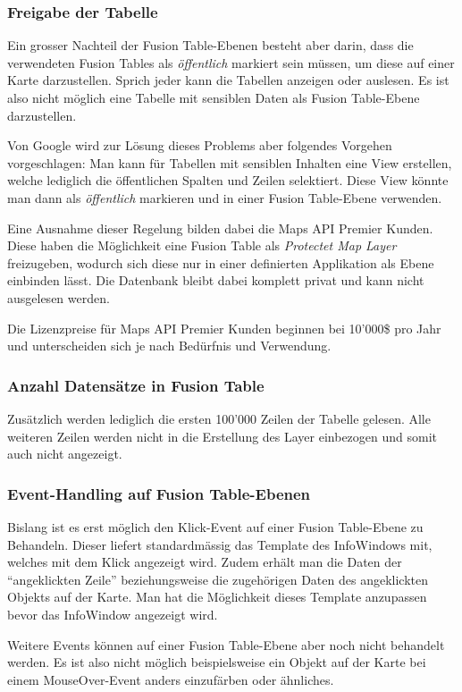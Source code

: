 \subsubsection{Freigabe der Tabelle}
Ein grosser Nachteil der Fusion Table-Ebenen besteht aber darin, dass die verwendeten Fusion Tables als  \emph{öffentlich} markiert sein müssen, um diese auf einer Karte darzustellen. Sprich jeder kann die Tabellen anzeigen oder auslesen. Es ist also nicht möglich eine Tabelle mit sensiblen Daten als Fusion Table-Ebene darzustellen.

Von Google wird zur Lösung dieses Problems aber folgendes Vorgehen vorgeschlagen: Man kann für Tabellen mit sensiblen Inhalten eine View erstellen, welche lediglich die öffentlichen Spalten und Zeilen selektiert. Diese View könnte man dann als \emph{öffentlich} markieren und in einer Fusion Table-Ebene verwenden.

Eine Ausnahme dieser Regelung bilden dabei die Maps API Premier Kunden. Diese haben die Möglichkeit eine Fusion Table als \emph{Protectet Map Layer} freizugeben, wodurch sich diese nur in einer definierten Applikation als Ebene einbinden lässt. Die Datenbank bleibt dabei komplett privat und kann nicht ausgelesen werden.

Die Lizenzpreise für Maps API Premier Kunden beginnen bei 10'000\$ pro Jahr und unterscheiden sich je nach Bedürfnis und Verwendung. 

\subsubsection{Anzahl Datensätze in Fusion Table}
Zusätzlich werden lediglich die ersten 100'000 Zeilen der Tabelle gelesen. Alle weiteren Zeilen werden nicht in die Erstellung des Layer einbezogen und somit auch nicht angezeigt.

\subsubsection{Event-Handling auf Fusion Table-Ebenen}
Bislang ist es erst möglich den Klick-Event auf einer Fusion Table-Ebene zu Behandeln. Dieser liefert standardmässig das Template des InfoWindows mit, welches mit dem Klick angezeigt wird. Zudem erhält man die Daten der "`angeklickten Zeile"' beziehungsweise die zugehörigen Daten des angeklickten Objekts auf der Karte. Man hat die Möglichkeit dieses Template anzupassen bevor das InfoWindow angezeigt wird.

Weitere Events können auf einer Fusion Table-Ebene aber noch nicht behandelt werden. Es ist also nicht möglich beispielsweise ein Objekt auf der Karte bei einem MouseOver-Event anders einzufärben oder ähnliches.

